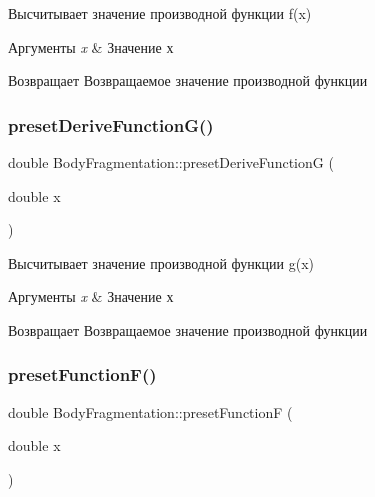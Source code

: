 Высчитывает значение производной функции f(x) 
\begin{DoxyParams}{Аргументы}
{\em x} & Значение х \\
\hline
\end{DoxyParams}
\begin{DoxyReturn}{Возвращает}
Возвращаемое значение производной функции 
\end{DoxyReturn}
\mbox{\label{class_body_fragmentation_a6a9c0eaa064025336ed5338d329955b5}} 
\subsubsection{\texorpdfstring{preset\+Derive\+Function\+G()}{presetDeriveFunctionG()}}
{\footnotesize\ttfamily double Body\+Fragmentation\+::preset\+Derive\+FunctionG (\begin{DoxyParamCaption}\item[{double}]{x }\end{DoxyParamCaption})\hspace{0.3cm}{\ttfamily [static]}}

Высчитывает значение производной функции g(x) 
\begin{DoxyParams}{Аргументы}
{\em x} & Значение х \\
\hline
\end{DoxyParams}
\begin{DoxyReturn}{Возвращает}
Возвращаемое значение производной функции 
\end{DoxyReturn}
\mbox{\label{class_body_fragmentation_aed0eb252da338a5164957a5aee5486c6}} 
\subsubsection{\texorpdfstring{preset\+Function\+F()}{presetFunctionF()}}
{\footnotesize\ttfamily double Body\+Fragmentation\+::preset\+FunctionF (\begin{DoxyParamCaption}\item[{double}]{x }\end{DoxyParamCaption})\hspace{0.3cm}{\ttfamily [static]}}

